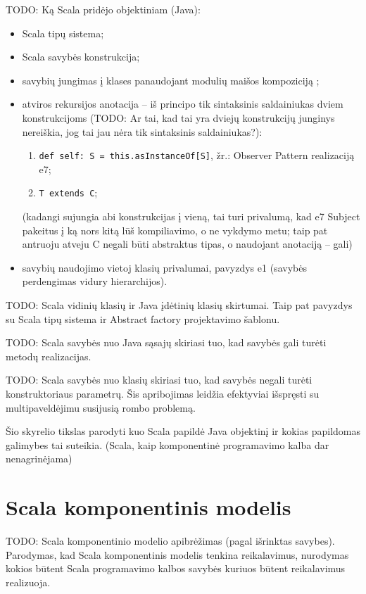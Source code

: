 TODO: Ką Scala pridėjo objektiniam (Java):
\begin{itemize}
  \item Scala tipų sistema;
  \item Scala savybės  konstrukcija;
  \item savybių jungimas į klases panaudojant modulių maišos
    kompoziciją ;
  \item atviros rekursijos anotacija  –
    iš principo tik sintaksinis saldainiukas dviem konstrukcijoms
    (TODO: Ar tai, kad tai yra dviejų konstrukcijų junginys nereiškia,
    jog tai jau nėra tik sintaksinis saldainiukas?):
    \begin{enumerate}
      \item \verb|def self: S = this.asInstanceOf[S]|, žr.: Observer
        Pattern realizaciją e7;
      \item \verb|T extends C|;
    \end{enumerate}
    (kadangi sujungia abi konstrukcijas į vieną, tai turi privalumą, kad
    e7 Subject pakeitus į ką nors kitą lūš kompiliavimo, o ne vykdymo
    metu; taip pat antruoju atveju C negali būti abstraktus tipas, o
    naudojant anotaciją – gali)
  \item savybių naudojimo vietoj klasių privalumai, pavyzdys e1
    (savybės perdengimas vidury hierarchijos).
\end{itemize}

TODO: Scala vidinių klasių ir Java įdėtinių klasių skirtumai. Taip pat
pavyzdys su Scala tipų sistema ir Abstract factory projektavimo šablonu.

TODO: Scala savybės nuo Java sąsajų skiriasi tuo, kad savybės gali turėti
metodų realizacijas.

TODO: Scala savybės nuo klasių skiriasi tuo, kad savybės negali turėti
konstruktoriaus parametrų. Šis apribojimas leidžia efektyviai
išspręsti su multipaveldėjimu susijusią rombo problemą.

Šio skyrelio tikslas parodyti kuo Scala papildė Java objektinį ir
kokias papildomas galimybes tai suteikia. (Scala, kaip komponentinė
programavimo kalba dar nenagrinėjama)

\section{Scala komponentinis modelis}

TODO: Scala komponentinio modelio apibrėžimas (pagal išrinktas savybes).
Parodymas, kad Scala komponentinis modelis tenkina reikalavimus,
nurodymas kokios būtent Scala programavimo kalbos savybės kuriuos
būtent reikalavimus realizuoja.

